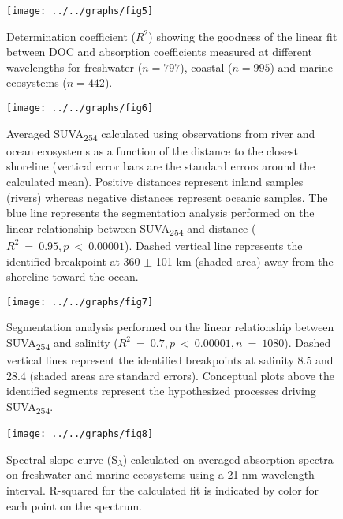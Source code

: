 \documentclass[10pt,a4paper]{scrartcl}
\begin{document}
\clearpage
\newpage

\begin{figure}[h]
	\centering
	\texttt{[image: ../../graphs/fig5]}
	\caption{Determination coefficient ($R^2$) showing the goodness of the linear fit between DOC and absorption coefficients measured at different wavelengths for freshwater ($n = 797$), coastal ($n = 995$) and marine ecosystems ($n = 442$).}
\end{figure}

\clearpage
\newpage

\begin{figure}[h]
	\centering
	\texttt{[image: ../../graphs/fig6]}
	\caption{Averaged SUVA\textsubscript{254} calculated using observations from river and ocean ecosystems as a function of the distance to the closest shoreline (vertical error bars are the standard errors around the calculated mean). Positive distances represent inland samples (rivers) whereas negative distances represent oceanic samples. The blue line represents the segmentation analysis performed on the linear relationship between SUVA\textsubscript{254} and distance ($R^2~=~0.95, p~<~0.00001$). Dashed vertical line represents the identified breakpoint at 360 $\pm$ 101 km (shaded area) away from the shoreline toward the ocean.}

\end{figure}

\clearpage
\newpage

\begin{figure}[h]
	\centering
	\texttt{[image: ../../graphs/fig7]}
	\caption{Segmentation analysis performed on the linear relationship between SUVA\textsubscript{254} and salinity ($R^2~=~0.7, p~<~0.00001, n~=~1080$). Dashed vertical lines represent the identified breakpoints at salinity 8.5 and 28.4 (shaded areas are standard errors). Conceptual plots above the identified segments represent the hypothesized processes driving SUVA\textsubscript{254}.}
\end{figure}

\clearpage
\newpage

\begin{figure}[h]
	\centering
	\texttt{[image: ../../graphs/fig8]}
	\caption{Spectral slope curve (S\textsubscript{$\lambda$}) calculated on averaged absorption spectra on freshwater and marine ecosystems using a 21 nm wavelength interval. R-squared for the calculated fit is indicated by color for each point on the spectrum.}
\end{figure}
\end{document}
